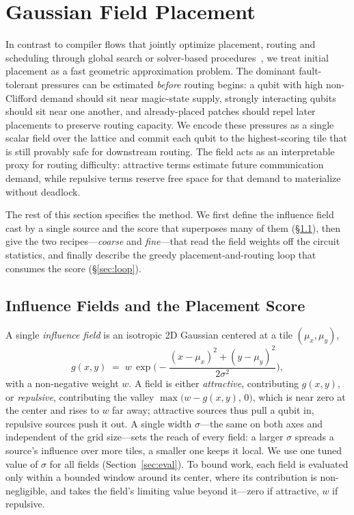 \section{Gaussian Field Placement}
\label{sec:approach}

In contrast to compiler flows that jointly optimize placement, routing and
scheduling through global search or solver-based
procedures~\cite{wisq,zhu2024ecmas}, we treat initial placement as a fast
geometric approximation problem. The dominant fault-tolerant pressures can be
estimated \emph{before} routing begins: a qubit with high non-Clifford demand
should sit near magic-state supply, strongly interacting qubits should sit near
one another, and already-placed patches should repel later placements to preserve
routing capacity. We encode these pressures as a single scalar field over the
lattice and commit each qubit to the highest-scoring tile that is still provably
safe for downstream routing. The field acts as an interpretable proxy for routing
difficulty: attractive terms estimate future communication demand, while repulsive
terms reserve free space for that demand to materialize without deadlock.

The rest of this section specifies the method. We first define the
influence field cast by a single source and the score that superposes many of them
(\S\ref{sec:fields}), then give the two recipes---\emph{coarse} and \emph{fine}---that
read the field weights off the circuit statistics, and finally describe the greedy
placement-and-routing loop that consumes the score (\S\ref{sec:loop}).

\subsection{Influence Fields and the Placement Score}
\label{sec:fields}

A single \emph{influence field} is an isotropic 2D Gaussian centered at a tile
$(\mu_x,\mu_y)$,
\begin{equation}
g(x,y) \;=\; w\,\exp\!\Big(\!-\frac{(x-\mu_x)^2+(y-\mu_y)^2}{2\sigma^2}\Big),
\label{eq:gauss}
\end{equation}
with a non-negative weight $w$. A field is either \emph{attractive}, contributing
$g(x,y)$, or \emph{repulsive}, contributing the valley
$\max\!\big(w-g(x,y),\,0\big)$, which is near zero at the center and rises to $w$
far away; attractive sources thus pull a qubit in, repulsive sources push it out.
A single width $\sigma$---the same on both axes and independent of the grid
size---sets the reach of every field: a larger $\sigma$ spreads a source's
influence over more tiles, a smaller one keeps it local. We use one tuned value of
$\sigma$ for all fields (Section~\ref{sec:eval}). To bound work, each field is
evaluated only within a bounded window around its center, where its contribution
is non-negligible, and takes the field's limiting value beyond it---zero if attractive, $w$ if repulsive.

